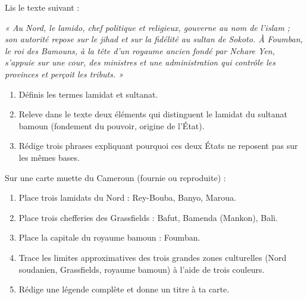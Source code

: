 \documentclass[11pt]{article}
\newcommand{\cle}[1]{{\popxbold\color{popdark}#1}}
\begin{document}
\begin{exercice}
Lis le texte suivant :

\emph{« Au Nord, le lamido, chef politique et religieux, gouverne au nom de l'islam ; son autorité repose sur le jihad et sur la fidélité au sultan de Sokoto. À Foumban, le roi des Bamouns, à la tête d'un royaume ancien fondé par Nchare Yen, s'appuie sur une cour, des ministres et une administration qui contrôle les provinces et perçoit les tributs. »}

\begin{enumerate}
\item Définis les termes \cle{lamidat} et \cle{sultanat}.
\item Releve dans le texte deux éléments qui distinguent le lamidat du sultanat bamoun (fondement du pouvoir, origine de l'État).
\item Rédige trois phrases expliquant pourquoi ces deux États ne reposent pas sur les mêmes bases.
\end{enumerate}
\end{exercice}

\begin{exercice}
Sur une carte muette du Cameroun (fournie ou reproduite) :
\begin{enumerate}
\item Place trois lamidats du Nord : Rey-Bouba, Banyo, Maroua.
\item Place trois chefferies des Grassfields : Bafut, Bamenda (Mankon), Bali.
\item Place la capitale du royaume bamoun : Foumban.
\item Trace les limites approximatives des trois grandes zones culturelles (Nord soudanien, Grassfields, royaume bamoun) à l'aide de trois couleurs.
\item Rédige une légende complète et donne un titre à ta carte.
\end{enumerate}
\end{exercice}
\end{document}
